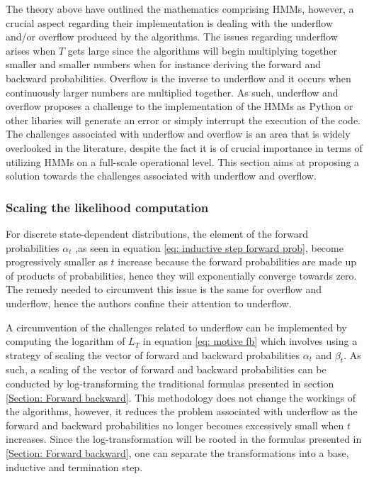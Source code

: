 The theory above have outlined the mathematics comprising HMMs, however, a crucial aspect regarding their implementation is dealing with the underflow and/or overflow produced by the algorithms. The issues regarding underflow arises when $T$ gets large since the algorithms will begin multiplying together smaller and smaller numbers when for instance deriving the forward and backward probabilities. Overflow is the inverse to underflow and it occurs when continuously larger numbers are multiplied together. As such, underflow and overflow proposes a challenge to the implementation of the HMMs as Python or other libaries will generate an error or simply interrupt the execution of the code. The challenges associated with underflow and overflow is an area that is widely overlooked in the literature, despite the fact it is of crucial importance in terms of utilizing HMMs on a full-scale operational level. This section aims at proposing a solution towards the challenges associated with underflow and overflow.

\subsubsection{Scaling the likelihood computation}
For discrete state-dependent distributions, the element of the forward probabilities $\alpha_t$ ,as seen in equation \ref{eq: inductive step forward prob}, become progressively smaller as $t$ increase because the forward probabilities are made up of products of probabilities, hence they will exponentially converge towards zero. The remedy needed to circumvent this issue is the same for overflow and underflow, hence the authors confine their attention to underflow.

A circumvention of the challenges related to underflow can be implemented by computing the logarithm of $L_T$ in equation \ref{eq: motive fb} which involves using a strategy of scaling the vector of forward and backward probabilities $\alpha_t$ and $\beta_t$. As such, a scaling of the vector of forward and backward probabilities can be conducted by log-transforming the  traditional formulas presented in section \ref{Section: Forward backward}. This methodology does not change the workings of the algorithms, however, it reduces the problem associated with underflow as the forward and backward probabilities no longer becomes excessively small when $t$ increases. Since the log-transformation will be rooted in the formulas presented in \ref{Section: Forward backward}, one can separate the transformations into a base, inductive and termination step.  

